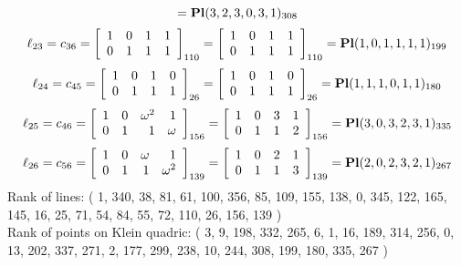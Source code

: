 \documentclass{article}
\begin{document}
{$$={\rm\bf Pl}(3,2,3,0,3,1 )_{308}$$
$$
\ell_{23} = c_{36} = 
\left[
\begin{array}{*{4}{r}}
1 & 0 & 1 & 1\\
0 & 1 & 1 & 1\\
\end{array}
\right]
_{110}
=
\left[
\begin{array}{*{4}c}
1  & 0  & 1  & 1\\
0  & 1  & 1  & 1\\
\end{array}
\right]_{110}
={\rm\bf Pl}(1,0,1,1,1,1 )_{199}$$
$$
\ell_{24} = c_{45} = 
\left[
\begin{array}{*{4}{r}}
1 & 0 & 1 & 0\\
0 & 1 & 1 & 1\\
\end{array}
\right]
_{26}
=
\left[
\begin{array}{*{4}c}
1  & 0  & 1  & 0\\
0  & 1  & 1  & 1\\
\end{array}
\right]_{26}
={\rm\bf Pl}(1,1,1,0,1,1 )_{180}$$
$$
\ell_{25} = c_{46} = 
\left[
\begin{array}{*{4}{r}}
1 & 0 & \omega^{2} & 1\\
0 & 1 & 1 & \omega \\
\end{array}
\right]
_{156}
=
\left[
\begin{array}{*{4}c}
1  & 0  & 3  & 1\\
0  & 1  & 1  & 2\\
\end{array}
\right]_{156}
={\rm\bf Pl}(3,0,3,2,3,1 )_{335}$$
$$
\ell_{26} = c_{56} = 
\left[
\begin{array}{*{4}{r}}
1 & 0 & \omega  & 1\\
0 & 1 & 1 & \omega^{2}\\
\end{array}
\right]
_{139}
=
\left[
\begin{array}{*{4}c}
1  & 0  & 2  & 1\\
0  & 1  & 1  & 3\\
\end{array}
\right]_{139}
={\rm\bf Pl}(2,0,2,3,2,1 )_{267}$$
Rank of lines: ( 1, 340, 38, 81, 61, 100, 356, 85, 109, 155, 138, 0, 345, 122, 165, 145, 16, 25, 71, 54, 84, 55, 72, 110, 26, 156, 139 )\\
Rank of points on Klein quadric: ( 3, 9, 198, 332, 265, 6, 1, 16, 189, 314, 256, 0, 13, 202, 337, 271, 2, 177, 299, 238, 10, 244, 308, 199, 180, 335, 267 )\\
}
\end{document}
